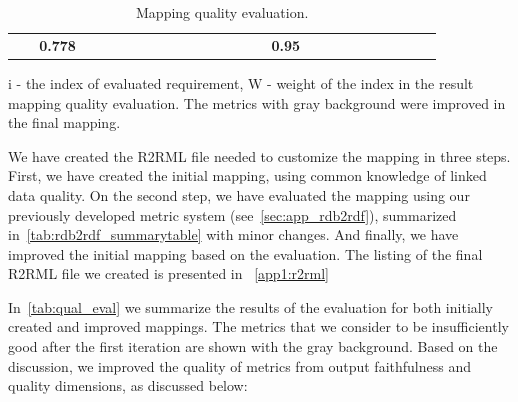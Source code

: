 \documentclass[ngerman,UKenglish,table]{scrbook}
\begin{document}
\begin{table}[!ht]
\begin{tabular}{p{0.05\linewidth}|p{0.28\linewidth}|p{0.11\linewidth}|p{0.09\linewidth}|p{0.06\linewidth}|p{0.11\linewidth}|p{0.09\linewidth}|p{0.06\linewidth}}
\rowcolor[gray]{.7}
\hline
\multicolumn{4}{r|}{\textbf{Total}}& \textbf{0.778}  & & & \textbf{0.95} \\

\end{tabular}
\caption{Mapping quality evaluation.}
\label{tab:qual_eval}
\scriptsize{i - the index of evaluated requirement, W - weight of the index in the result mapping quality evaluation. The metrics with gray background were improved in the final mapping.}

\end{table}

We have created the R2RML file needed to customize the mapping in three steps.
First, we have created the initial mapping, using common knowledge of linked data quality.
On the second step, we have evaluated the mapping using our previously developed metric system (see~\autoref{sec:app_rdb2rdf}), summarized in~\autoref{tab:rdb2rdf_summarytable} with minor changes.
And finally, we have improved the initial mapping based on the evaluation.
The listing of the final R2RML file we created is presented in ~\autoref{app1:r2rml}

In~\autoref{tab:qual_eval} we summarize the results of the evaluation for both initially created and improved mappings.
The metrics that we consider to be insufficiently good after the first iteration are shown with the gray background.
Based on the discussion, we improved the quality of metrics from output faithfulness and quality dimensions, as discussed below:
\end{document}

